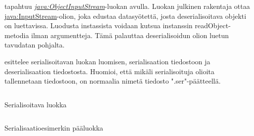 \documentclass{tufte-book}
\newcommand{\java}[1]{\underline{\gls{java:#1}}}
\newcommand{\newjava}[1]{\textit{\java{#1}}}
\newcommand{\code}[3]{
\begin{listing}
    \inputminted{java}{OhjelmointiopasEsimerkit/src/#1/#2.java}
    \caption{#3}
    \label{Java-#1-#2}
\end{listing}
}
\begin{document}
 tapahtuu \newjava{ObjectInputStream}-luokan avulla. Luokan
julkinen rakentaja ottaa \java{InputStream}-olion, joka edustaa datasyötettä, josta
deserialisoitava objekti on luettavissa. Luodusta instassista voidaan kutsua instanssin
readObject-metodia ilman argumentteja. Tämä palauttaa deserialisoidun olion luetun tavudatan
pohjalta.

 esittelee serialisoitavan luokan luomisen, serialisaation
tiedostoon ja deserialisaation tiedostosta. Huomioi, että mikäli serialisoituja olioita
tallennetaan tiedostoon, on normaalia nimetä tiedosto ".ser"-päätteellä.

\code{week6/serializationexample}{SerializableData}{Serialisoitava luokka}
\code{week6/serializationexample}{Main}{Serialisaatioesimerkin pääluokka}


\clearpage
\printglossary[title=Sanasto, toctitle=Sanasto]
\printglossary[type=java, title=Javan avainsanat, toctitle=Javan avainsanat]

\end{document}
